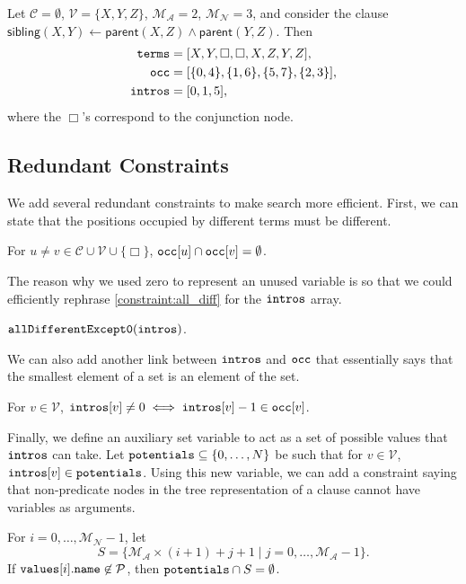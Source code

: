\documentclass[runningheads]{llncs}
\newcommand{\variable}[1]{\texttt{\textup{#1}}}
\newcommand{\predicates}{\mathcal{P}}
\newcommand{\variables}{\mathcal{V}}
\newcommand{\constants}{\mathcal{C}}
\newcommand{\maxArity}{\mathcal{M}_{\mathcal{A}}}
\newcommand{\maxNumNodes}{\mathcal{M}_{\mathcal{N}}}
\begin{document}
\begin{example} \label{example:sibling}
  Let $\constants{} = \emptyset$, $\variables{} = \{ X, Y, Z \}$, $\maxArity{} =
  2$, $\maxNumNodes{} = 3$, and consider the clause $\mathsf{sibling}(X, Y)
  \gets \mathsf{parent}(X, Z) \land \mathsf{parent}(Y, Z)$. Then
  \begin{align*}
    \variable{terms} &= [X, Y, \Box, \Box, X, Z, Y, Z], \\
    \variable{occ} &= [\{ 0, 4 \}, \{ 1, 6 \}, \{ 5, 7 \}, \{ 2, 3 \}], \\
    \variable{intros} &= [0, 1, 5],
  \end{align*}
  where the $\Box$'s correspond to the conjunction node.
\end{example}

\subsection{Redundant Constraints}

We add several redundant constraints to make search more efficient. First,
we can state that the positions occupied by different terms must be different.
\begin{constraint} \label{constraint:all_diff}
  For $u \ne v \in \constants{} \cup \variables{} \cup \{ \Box \}$,
  $\variable{occ}[u] \cap \variable{occ}[v] = \emptyset$.
\end{constraint}
The reason why we used zero to represent an unused variable is so that we could
efficiently rephrase \cref{constraint:all_diff} for the $\variable{intros}$
array.
\begin{constraint} \label{constraint:diffbutzero}
  $\variable{allDifferentExcept0}(\variable{intros})$.
\end{constraint}
We can also add another link between $\variable{intros}$ and $\variable{occ}$
that essentially says that the smallest element of a set is an element of the
set.
\begin{constraint}
  For $v \in \variables{}$, $\variable{intros}[v] \ne 0 \iff
  \variable{intros}[v] - 1 \in \variable{occ}[v]$.
\end{constraint}
Finally, we define an auxiliary set variable to act as a set of possible values
that $\variable{intros}$ can take. Let $\variable{potentials} \subseteq \{ 0,
\dots, N \}$ be such that for $v \in \variables{}$, $\variable{intros}[v] \in
\variable{potentials}$. Using this new variable, we can add a constraint saying
that non-predicate nodes in the tree representation of a clause cannot have
variables as arguments.
\begin{constraint} \label{constraint:potentialIntroductions}
  For $i = 0, \dots, \maxNumNodes{} - 1$, let
  \[
    S = \{ \maxArity{} \times (i + 1) + j + 1 \mid j = 0, \dots, \maxArity{} - 1
    \}.
  \]
  If $\variable{values}[i].\variable{name} \not\in \predicates{}$, then
  $\variable{potentials} \cap S = \emptyset$.
\end{constraint}
\end{document}
